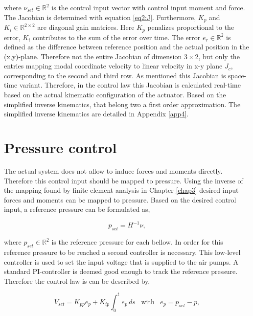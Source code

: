 where $\nu_{set} \in \mathbb{R}^2$ is the control input vector with control input moment and force. The Jacobian is determined with equation \ref{eq2:J}. Furthermore, $K_p$ and $K_i \in \mathbb{R}^{2\times 2}$ are diagonal gain matrices. Here $K_p$ penalizes proportional to the error, $K_i$ contributes to the sum of the error over time. The error $e_r \in \mathbb{R}^2$ is defined as the difference between reference position and the actual position in the (x,y)-plane. Therefore not the entire Jacobian of dimension $3 \times 2$, but only the entries mapping modal coordinate velocity to linear velocity in x-y plane $J_c$, corresponding to the second and third row. As mentioned this Jacobian is space-time variant. Therefore, in the control law this Jacobian is calculated real-time based on the actual kinematic configuration of the actuator. Based on the simplified inverse kinematics, that belong two a first order approximation. The simplified inverse kinematics are detailed in Appendix \ref{app4}.

\section{Pressure control}


The actual system does not allow to induce forces and moments directly. Therefore this control input should be mapped to pressure. Using the inverse of the mapping found by finite element analysis in Chapter \ref{chap3} desired input forces and moments can be mapped to pressure. Based on the desired control input, a reference pressure can be formulated as,

\begin{equation}
    p_{set} = H^{-1}\nu,
\end{equation}


where $p_{set} \in \mathbb{R}^2$ is the reference pressure for each bellow. In order for this reference pressure to be reached a second controller is necessary. This low-level controller is used to set the input voltage that is supplied to the air pumps. A standard PI-controller is deemed good enough to track the reference pressure. Therefore the control law is can be described by,

\begin{equation}
    V_{set} = K_{pp}e_p + K_{ip} \int_0^t e_p \hspace{2pt} ds \hspace{10pt} \text{with} \hspace{10pt} e_p = p_{set} - p,
\end{equation}



